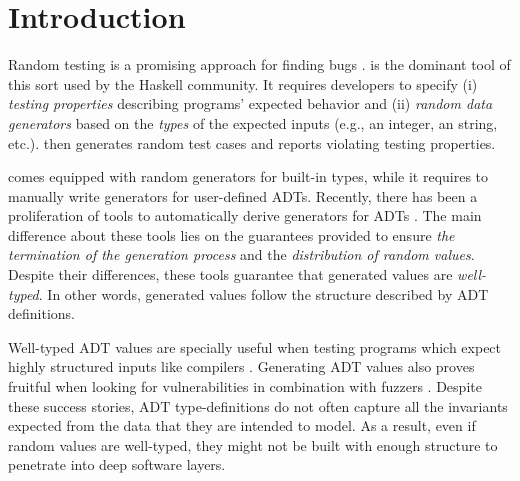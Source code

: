 \section{Introduction}

Random testing is a promising approach for finding bugs
\cite{HughesNSA16,HughesPAN16,ArtsHNS15}.
%
\quickcheck \cite{ClaessenH00} is the dominant tool of this sort used by the
Haskell community.
%
It requires developers to specify (i) \emph{testing properties} describing
programs' expected behavior and (ii) \emph{random data generators} based on the
\emph{types} of the expected inputs (e.g., an integer, an string,
etc.). %
%
\quickcheck then generates random test cases and reports violating testing
properties.


\quickcheck comes equipped with random generators for built-in types, while it
requires to manually write generators for user-defined ADTs.
%
Recently, there has been a proliferation of tools to automatically derive
\quickcheck generators for ADTs
\cite{mitchell2007,RuncimanNL08,DuregardJW12,grieco2017,DBLP:conf/haskell/MistaRH18}.
%
The main difference about these tools lies on the guarantees provided to ensure
\emph{the termination of the generation process} and the \emph{distribution of
  random values}.
%
Despite their differences, these tools guarantee that generated values are
\emph{well-typed}.
%
In other words, generated values follow the structure described by ADT
definitions.


Well-typed ADT values are specially useful when testing programs which expect
highly structured inputs like compilers \cite{Palka11,MidtgaardJKNN17}.
%
Generating ADT values also proves fruitful when looking for vulnerabilities in
combination with fuzzers \cite{GriecoCB16,grieco2017}.
%
%
Despite these success stories, ADT type-definitions do not often capture all the
invariants expected from the data that they are intended to model.
%
As a result, even if random values are well-typed, they might not be built with
enough structure to penetrate into deep software layers.


